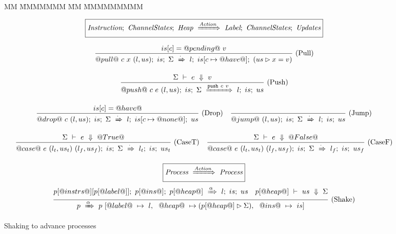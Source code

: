\begin{figure}
\begin{tabbing}
MM \= MMMMMMM \= MM \= MMMMMMMMM\kill
\end{tabbing}


$$
  \boxed{
    \textit{Instruction};~\textit{ChannelStates};~\textit{Heap}~\xRightarrow{\textit{Action}}~\textit{Label};~\textit{ChannelStates};~\textit{Updates}
  }
$$

$$
\enskip \frac {\displaystyle 
  is[c] = @pending@~v
} {\displaystyle 
  @pull@~c~x~(l,us);~is;~\Sigma~\xRightarrow{\cdot}~l;~is[c \mapsto @have@];~(us \rhd x = v)
} \  \mbox{(Pull)} \enskip
$$

$$
\enskip \frac {\displaystyle 
  \Sigma~\vdash~e~\Downarrow~v
} {\displaystyle 
  @push@~c~e~(l,us);~is;~\Sigma~\xRightarrow{\texttt{push}~c~v}~l;~is;~us
} \  \mbox{(Push)} \enskip
$$

$$
\enskip \frac {\displaystyle 
  is[c] = @have@
} {\displaystyle 
  @drop@~c~(l,us);~is;~\Sigma~\xRightarrow{\cdot}~l;~is[c \mapsto @none@];~us
} \  \mbox{(Drop)} \enskip
\enskip \frac {\displaystyle 
} {\displaystyle 
  @jump@~(l,us);~is;~\Sigma~\xRightarrow{\cdot}~l;~is;~us
} \  \mbox{(Jump)} \enskip
$$

$$
\enskip \frac {\displaystyle 
  \Sigma~\vdash~e~\Downarrow~@True@
} {\displaystyle 
  @case@~e~(l_t,us_t)~(l_f,us_f);~is;~\Sigma~\xRightarrow{\cdot}~l_t;~is;~us_t
} \  \mbox{(CaseT)} \enskip
\enskip \frac {\displaystyle 
  \Sigma~\vdash~e~\Downarrow~@False@
} {\displaystyle 
  @case@~e~(l_t,us_t)~(l_f,us_f);~is;~\Sigma~\xRightarrow{\cdot}~l_f;~is;~us_f
} \  \mbox{(CaseF)} \enskip
$$

\vspace{2em}

$$
  \boxed{\textit{Process}~\xRightarrow{\textit{Action}}~\textit{Process}}
$$
$$
\enskip \frac {\displaystyle 
  p[@instrs@][p[@label@]];~p[@ins@];~p[@heap@]~\xRightarrow{\alpha}~l;~is;~us
  \quad
    p[@heap@]~\vdash~us~\Downarrow~\Sigma
} {\displaystyle 
  p~\xRightarrow{\alpha}~p~[    @label@~ \mapsto ~l
           , ~~ @heap@~  \mapsto (p[@heap@] \rhd \Sigma)
           , ~~ @ins@~   \mapsto ~is]
} \  \mbox{(Shake)} \enskip
$$


\caption{Shaking to advance processes}

\label{fig:Process:Eval:Shake}
\end{figure}

